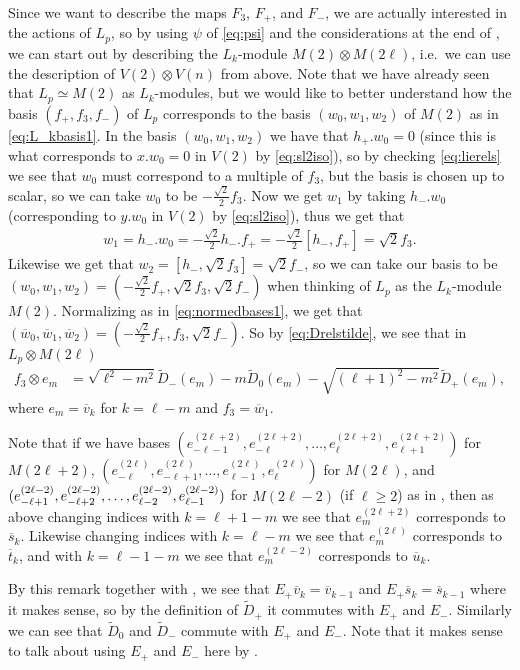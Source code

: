 Since we want to describe the maps $F_3$, $F_+$, and $F_-$, we are actually interested in the actions of $L_p$, so by using $\psi$ of \cref{eq:psi} and the considerations at the end of , we can start out by describing the $L_k$-module $M(2)\otimes M(2\ell)$, i.e.\ we can use the description of $V(2)\otimes V(n)$ from above. Note that we have already seen that $L_p\simeq M(2)$ as $L_k$-modules, but we would like to better understand how the basis $(f_+,f_3,f_-)$ of $L_p$ corresponds to the basis $(w_0,w_1,w_2)$ of $M(2)$ as in \cref{eq:L_kbasis1}. In the basis $(w_0,w_1,w_2)$ we have that $h_+ . w_0 = 0$ (since this is what corresponds to $x.w_0=0$ in $V(2)$ by \cref{eq:sl2iso}), so by checking \cref{eq:lierels} we see that $w_0$ must correspond to a multiple of $f_3$, but the basis is chosen up to scalar, so we can take $w_0$ to be $-\tfrac{\sqrt{2}}{2}f_3$. Now we get $w_1$ by taking $h_- . w_0$ (corresponding to $y.w_0$ in $V(2)$ by \cref{eq:sl2iso}), thus we get that
\begin{align*}
  w_1 = h_-.w_0 = -\tfrac{\sqrt{2}}{2}h_- . f_+ = -\tfrac{\sqrt{2}}{2}[h_-,f_+] = \sqrt{2}f_3.
\end{align*}
Likewise we get that $w_2=[h_-,\sqrt{2}f_3]=\sqrt{2}f_-$, so we can take our basis to be $(w_0,w_1,w_2)=(-\tfrac{\sqrt{2}}{2}f_+,\sqrt{2}f_3,\sqrt{2}f_-)$ when thinking of $L_p$ as the $L_k$-module $M(2)$. Normalizing as in \cref{eq:normedbases1}, we get that $(\overline w_0,\overline w_1,\overline w_2)=(-\tfrac{\sqrt{2}}{2}f_+,f_3,\sqrt{2}f_-)$. So by \cref{eq:Drelstilde}, we see that in $L_p\otimes M(2\ell)$
\begin{align*}
  f_3 \otimes e_m &= \sqrt{\ell^2-m^2}\widetilde D_-(e_m) - m\widetilde D_0(e_m) - \sqrt{(\ell+1)^2-m^2}\widetilde D_+(e_m),
\end{align*}
where $e_m=\overline v_k$ for $k=\ell-m$ and $f_3 = \overline w_1$.
\begin{remark}\label{rem:baseswithindexchange}
  Note that if we have bases $(e_{-\ell-1}^{(2\ell+2)},e_{-\ell}^{(2\ell+2)},\dotsc,e_{\ell}^{(2\ell+2)},e_{\ell+1}^{(2\ell+2)})$ for $M(2\ell+2)$, $(e_{-\ell}^{(2\ell)},e_{-\ell+1}^{(2\ell)},\dotsc,e_{\ell-1}^{(2\ell)},e_{\ell}^{(2\ell)})$ for $M(2\ell)$, and $(e_{-\ell+1}^{(2\ell-2)},e_{-\ell+2}^{(2\ell-2)},\dotsc,\\ e_{\ell-2}^{(2\ell-2)},e_{\ell-1}^{(2\ell-2)})$ for $M(2\ell-2)$ (if $\ell\geq 2$) as in , then as above changing indices with $k=\ell+1-m$ we see that $e_m^{(2\ell+2)}$ corresponds to $\overline s_k$. Likewise changing indices with $k=\ell-m$ we see that $e_m^{(2\ell)}$ corresponds to $\overline t_k$, and with $k=\ell-1-m$ we see that $e_m^{(2\ell-2)}$ corresponds to $\overline u_k$. 
\end{remark}
By this remark together with , we see that $E_+ \overline v_k = \overline v_{k-1}$ and $E_+ \overline s_k = \overline s_{k-1}$ where it makes sense, so by the definition of $\widetilde D_+$ it commutes with $E_+$ and $E_-$. Similarly we can see that $\widetilde D_0$ and $\widetilde D_-$ commute with $E_+$ and $E_-$. Note that it makes sense to talk about using $E_+$ and $E_-$ here by .

